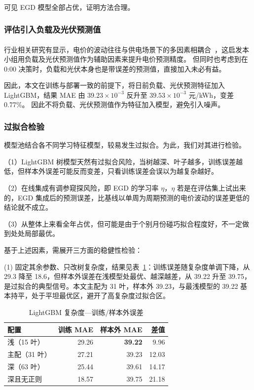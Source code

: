 \documentclass[zihao=-4,a4paper,fontset=none]{ctexart}
\newcommand{\upcite}[1]{\textsuperscript{\cite{#1}}}
\begin{document}
可见 EGD 模型全部占优，证明方法合理。

\subsubsection{评估引入负载及光伏预测值}
行业相关研究有显示，电价的波动往往与供电场景下的多因素相耦合~\upcite{shaoy2025}，这启发本小组用负载及光伏预测值作为辅助因素来提升电价预测精度。
但同时也考虑到在 0:00 决策时，负载和光伏本身也是带误差的预测值，直接加入未必有益。

因此，本文在训练与部署一致的前提下，将日前负载、光伏预测特征加入 LightGBM，结果 MAE 由 $39.23\times10^{-3}$ 反升至 $39.53\times10^{-3}$ 元/kWh，变差 0.77\%。
因此不将负载、光伏预测值作为特征加入模型，避免引入噪声。

\subsubsection{过拟合检验}

模型池结合各不同学习特征模型，较易发生过拟合。为此，我们对其进行检验。

（1）LightGBM 树模型天然有过拟合风险，当树越深、叶子越多，训练误差越低，但样本外误差可能反而变差，只看训练误差会误以为越复杂越好。

（2）在线集成有调参窥探风险，即 EGD 的学习率 $\eta$，$\eta$ 若是在评估集上试出来的，EGD 集成后的预测误差，比基线以单周为周期预测的电价波动的误差更低的结论就不成立。

（3）从整体上来看全年占优，但可能是由于个别月份碰巧拟合程度好，不一定做到处处局部最优。

基于上述因素，需展开三方面的稳健性检验：

(1) 固定其余参数、只改树复杂度，结果见表~\ref{tab:p4overfit}：训练误差随复杂度单调下降，从 29.3 降至 18.6，但样本外误差在浅模型处最优、越深越差，从 39.22 升至 39.75，是过拟合的典型信号。本文主配为 31 叶，样本外 39.23，与最浅模型的 39.22 基本持平，处于平坦最优区，避开了高复杂度过拟合区。


\begin{table}[htbp]
\centering
\caption{LightGBM 复杂度—训练/样本外误差}
{\small
\begin{tabular}{lrrr}
\toprule
配置 & 训练 MAE & 样本外 MAE & 差值 \\
\midrule
浅（15 叶） & 29.26 & \textbf{39.22} & 9.96 \\
主配（31 叶） & 27.21 & 39.23 & 12.03 \\
深（63 叶） & 25.44 & 39.61 & 14.17 \\
深且无正则 & 18.57 & 39.75 & 21.18 \\
\bottomrule
\end{tabular}}
\label{tab:p4overfit}
\end{table}
\end{document}
